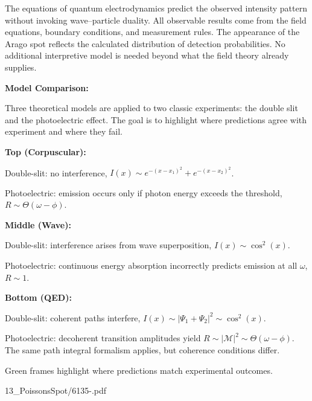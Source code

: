 The equations of quantum electrodynamics predict the observed intensity pattern without invoking wave–particle duality. All observable results come from the field equations, boundary conditions, and measurement rules. The appearance of the Arago spot reflects the calculated distribution of detection probabilities. No additional interpretive model is needed beyond what the field theory already supplies.

\begin{SideNotePage}{
  \textbf{Model Comparison:} \par Three theoretical models are applied to two classic experiments: the double slit and the photoelectric effect. The goal is to highlight where predictions agree with experiment and where they fail.

  \vspace{1.5em}
  \textbf{Top (Corpuscular):} \par Double-slit: no interference, \( I(x) \sim e^{-(x - x_1)^2} + e^{-(x - x_2)^2} \). \par Photoelectric: emission occurs only if photon energy exceeds the threshold, \( R \sim \Theta(\omega - \phi) \).

  \vspace{1.5em}
  \textbf{Middle (Wave):} \par Double-slit: interference arises from wave superposition, \( I(x) \sim \cos^2(x) \). \par Photoelectric: continuous energy absorption incorrectly predicts emission at all \( \omega \), \( R \sim 1 \).

  \vspace{1.5em}
  \textbf{Bottom (QED):} \par Double-slit: coherent paths interfere, \( I(x) \sim |\Psi_1 + \Psi_2|^2 \sim \cos^2(x) \). \par Photoelectric: decoherent transition amplitudes yield \( R \sim |\mathcal{M}|^2 \sim \Theta(\omega - \phi) \). The same path integral formalism applies, but coherence conditions differ.

  \vspace{1.5em}
  Green frames highlight where predictions match experimental outcomes.
}{13_PoissonsSpot/6135-.pdf}
\end{SideNotePage}
